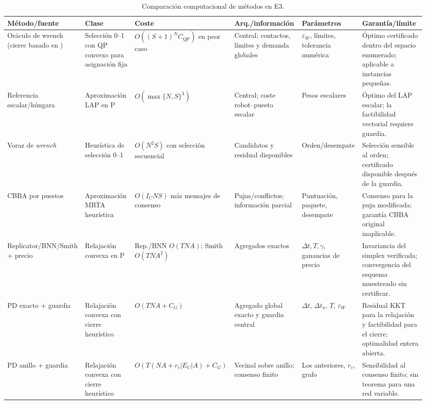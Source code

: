 \begin{table}[!htbp]
  \centering
  \caption{Comparación computacional de métodos en E3.}
  \label{tab:sp3-methods}
  \viutablefont
  \setlength{\tabcolsep}{1.4pt}
  \renewcommand{\arraystretch}{1.02}
  \begin{tabularx}{\textwidth}{>{\raggedright\arraybackslash}p{2.05cm} >{\raggedright\arraybackslash}p{1.55cm} >{\raggedright\arraybackslash}p{2.30cm} >{\raggedright\arraybackslash}p{2.0cm} >{\raggedright\arraybackslash}p{1.85cm} Y}
    \toprule
    Método/fuente & Clase & Coste & Arq./información & Parámetros & Garantía/límite \\
    \midrule
    Oráculo de wrench (cierre basado en \textcite{bicchi1995closure}) & Selección 0--1 con QP convexo para asignación fija & $O((S+1)^N C_{\mathrm{QP}})$ en peor caso & Central; contactos, límites y demanda globales & $\varepsilon_W$, límites, tolerancia numérica & Óptimo certificado dentro del espacio enumerado; aplicable a instancias pequeñas. \\
    Referencia escalar/húngara \parencite{kuhn1955Hungarian} & Aproximación LAP en P & $O(\max\{N,S\}^3)$ & Central; coste robot--puesto escalar & Pesos escalares & Óptimo del LAP escalar; la factibilidad vectorial requiere guardia. \\
    Voraz de \emph{wrench} & Heurística de selección 0--1 & $O(N^2S)$ con selección secuencial & Candidatos y residual disponibles & Orden/desempate & Selección sensible al orden; certificado disponible después de la guardia. \\
    CBBA por puestos \parencite{choiBrunetHow2009CBBA} & Aproximación MRTA heurística & $O(I_CNS)$ más mensajes de consenso & Pujas/conflictos; información parcial & Puntuación, paquete, desempate & Consenso para la puja modificada; garantía CBBA original inaplicable. \\
    Replicator/BNN/Smith + precio \parencite{sandholm2010population} & Relajación convexa en P & Rep./BNN $O(TNA)$; Smith $O(TNA^2)$ & Agregados exactos & $\Delta t,T,\gamma$, ganancias de precio & Invariancia del simplex verificada; convergencia del esquema muestreado sin certificar. \\
    PD exacto + guardia \parencite{cherukuri2016primalDual} & Relajación convexa con cierre heurístico & $O(TNA+C_G)$ & Agregado global exacto y guardia central & $\Delta t$, $\Delta t_\pi$, $T$, $\varepsilon_W$ & Residual KKT para la relajación y factibilidad para el cierre; optimalidad entera abierta. \\
    PD anillo + guardia \parencite{barreiro2017distributed} & Relajación convexa con cierre heurístico & $O(T(NA+r_c|E_C|A)+C_G)$ & Vecinal sobre anillo; consenso finito & Los anteriores, $r_c$, grafo & Sensibilidad al consenso finito; sin teorema para una red variable. \\

\end{tabularx}
\end{table}
